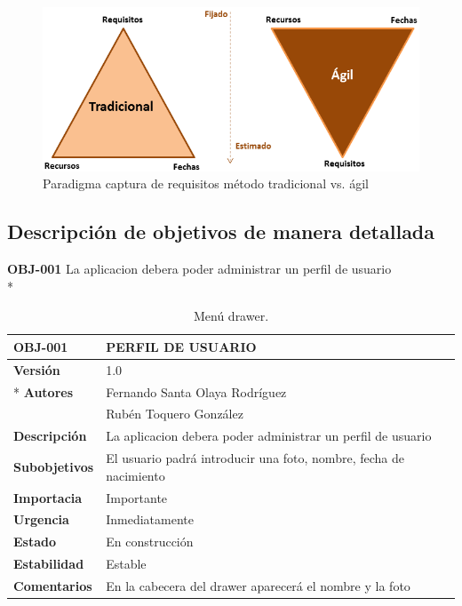 \documentclass[../pfc.tex]{subfiles}
\begin{document}
	\begin{figure}
		\centering
		\includegraphics[width=0.5\linewidth]{../images/paradigmaRequisitos}
		\caption{Paradigma captura de requisitos método tradicional vs. ágil}
		\label{fig:paradigmaRequisitos}
	\end{figure}
			
			
	\subsection{Descripción de objetivos de manera detallada}
	
	
	\textbf{OBJ-001}	La aplicacion debera poder administrar un perfil de usuario\\*
	
		\begin{table}[!hbt]
			\centering
			\begin{tabular}[t]{|l|l|}
				\hline \textbf{OBJ-001} & \textbf{PERFIL DE USUARIO} \\*
				\hline\hline \textbf{Versión} & 1.0 \\ *
				\hline\textbf{Autores} 	& Fernando Santa Olaya Rodríguez \\*
				& Rubén Toquero González\\*
				\hline \textbf{Descripción} & La aplicacion debera poder administrar un perfil de usuario\\* 
				\hline \textbf{Subobjetivos} & El usuario padrá introducir una foto, nombre, fecha de nacimiento \\* 
				\hline \textbf{Importacia} & Importante \\* 			
				\hline \textbf{Urgencia} & Inmediatamente \\* 
				\hline \textbf{Estado} & En construcción \\* 
				\hline \textbf{Estabilidad} & Estable \\* 
				\hline \textbf{Comentarios} & En la cabecera del drawer aparecerá el nombre y la foto \\* 
				\hline 
			\end{tabular}
			\caption{Menú drawer.}
			\label{tabla:req001}
		\end{table}
	
\end{document}
